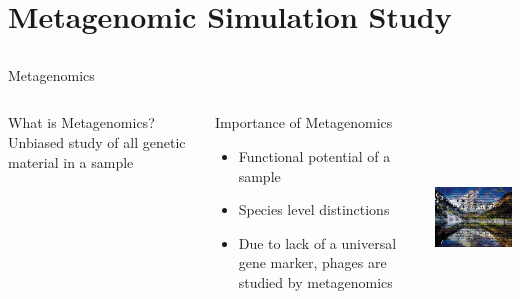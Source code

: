 \documentclass[11pt]{beamer}
\begin{document}
	
\section{Metagenomic Simulation Study}
\subsection{}
	\begin{frame}{Metagenomics}
	\begin{columns}
	\begin{block}{What is Metagenomics?}
	Unbiased study of all genetic material in a sample
	\end{block}
	\begin{block}{Importance of Metagenomics}
	\begin{itemize}
	\item Functional potential of a sample
	\item Species level distinctions
	\item Due to lack of a universal gene marker, phages are studied by metagenomics
	\end{itemize}
	\end{block}
	
	\includegraphics[height=5.5cm, width=5cm]{mosaic.png}
	\end{columns}
	\end{frame}
	
\end{document}
